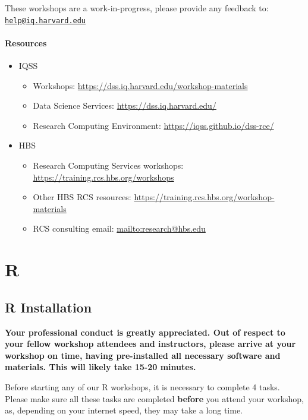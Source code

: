 \documentclass[]{book}
\providecommand{\tightlist}{%
  \setlength{\itemsep}{0pt}\setlength{\parskip}{0pt}}
\begin{document}
These workshops are a work-in-progress, please provide any feedback to: \href{mailto:help@iq.harvard.edu}{\nolinkurl{help@iq.harvard.edu}}

\hypertarget{resources}{%
\subsection{Resources}\label{resources}}

\begin{itemize}
\tightlist
\item
  IQSS

  \begin{itemize}
  \tightlist
  \item
    Workshops: \url{https://dss.iq.harvard.edu/workshop-materials}
  \item
    Data Science Services: \url{https://dss.iq.harvard.edu/}
  \item
    Research Computing Environment: \url{https://iqss.github.io/dss-rce/}
  \end{itemize}
\item
  HBS

  \begin{itemize}
  \tightlist
  \item
    Research Computing Services workshops: \url{https://training.rcs.hbs.org/workshops}
  \item
    Other HBS RCS resources: \url{https://training.rcs.hbs.org/workshop-materials}
  \item
    RCS consulting email: \url{mailto:research@hbs.edu}
  \end{itemize}
\end{itemize}

\hypertarget{part-r}{%
\part{R}\label{part-r}}

\hypertarget{r-installation}{%
\chapter{R Installation}\label{r-installation}}

\textbf{Your professional conduct is greatly appreciated. Out of respect to your fellow workshop attendees and instructors, please arrive at your workshop on time, having pre-installed all necessary software and materials. This will likely take 15-20 minutes.}

Before starting any of our R workshops, it is necessary to complete 4 tasks. Please make sure all these tasks are completed \textbf{before} you attend your workshop, as, depending on your internet speed, they may take a long time.
\end{document}
